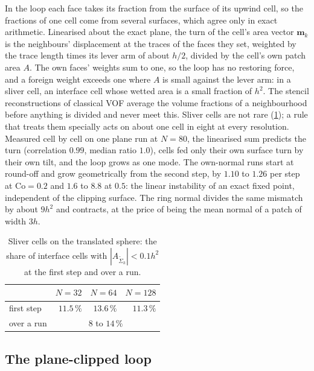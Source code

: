 In the loop each face takes its fraction from the surface of its upwind cell, so the fractions of one cell come from several surfaces, which agree only in exact arithmetic. Linearised about the exact plane, the turn of the cell's area vector $\mathbf{m}_k$ is the neighbours' displacement at the traces of the faces they set, weighted by the trace length times its lever arm of about $h/2$, divided by the cell's own patch area $A$. The own faces' weights sum to one, so the loop has no restoring force, and a foreign weight exceeds one where $A$ is small against the lever arm: in a sliver cell, an interface cell whose wetted area is a small fraction of $h^2$. The stencil reconstructions of classical VOF average the volume fractions of a neighbourhood before anything is divided and never meet this. Sliver cells are not rare (\cref{tab:tpf-sliver}); a rule that treats them specially acts on about one cell in eight at every resolution. Measured cell by cell on one plane run at $N = 80$, the linearised sum predicts the turn (correlation $0.99$, median ratio $1.0$), cells fed only their own surface turn by their own tilt, and the loop grows as one mode. The own-normal runs start at round-off and grow geometrically from the second step, by $1.10$ to $1.26$ per step at $\mathrm{Co} = 0.2$ and $1.6$ to $8.8$ at $0.5$: the linear instability of an exact fixed point, independent of the clipping surface. The ring normal divides the same mismatch by about $9h^2$ and contracts, at the price of being the mean normal of a patch of width $3h$.

\begin{table}[htbp]
\centering
\caption{Sliver cells on the translated sphere: the share of interface cells with $|A_{\tilde\Sigma_k}| < 0.1 h^2$ at the first step and over a run.}
\label{tab:tpf-sliver}
\footnotesize
\begin{tabular}{lrrr}
\toprule
 & $N = 32$ & $N = 64$ & $N = 128$ \\
\midrule
first step & $11.5\,\%$ & $13.6\,\%$ & $11.3\,\%$ \\
over a run & \multicolumn{3}{c}{$8$ to $14\,\%$} \\
\bottomrule
\end{tabular}
\end{table}

\subsection{The plane-clipped loop}
\label{sec:tpf-plane-loop}

